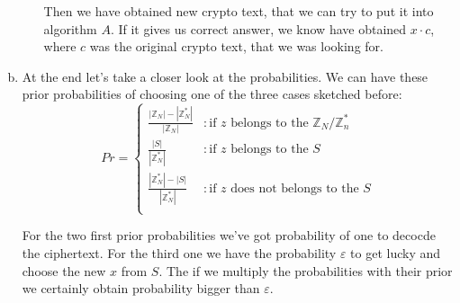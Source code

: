\documentclass[a4paper,10pt]{article}
\begin{document}
\begin{enumerate}[a)]
\begin{enumerate}[I)]
Then we have obtained new crypto text, that we can try to put it into algorithm $A$. If it gives us correct answer, we know have obtained $x\cdot c$, where $c$ was the original crypto text, that we was looking for. 
\end{enumerate}

\item At the end let's take a closer look at the probabilities. We can have these prior probabilities of choosing one of the three cases sketched before:
$$
Pr = \left\{
  \begin{array}{lr}
    \frac{|\mathds{Z}_N|-|\mathds{Z}_N^*|}{|\mathds{Z}_N|} & : \text{if }z\text{ belongs to the }\mathds{Z}_N/ \mathds{Z}_n^*\\
    \frac{|S|}{|\mathds{Z}_N^*|} & : \text{if }z\text{ belongs to the }S\\
    \frac{|\mathds{Z}_N^*|-|S|}{|\mathds{Z}_N^*|} & : \text{if }z\text{ does not belongs to the }S\\
  \end{array}
\right.
$$

For the two first prior probabilities we've got probability of one to decocde the ciphertext. For the third one we have the probability $\varepsilon$ to get lucky and choose the new $x$ from $S$. The if we multiply the probabilities with their prior we certainly obtain probability bigger than $\varepsilon$.
\end{enumerate}
\end{document}
